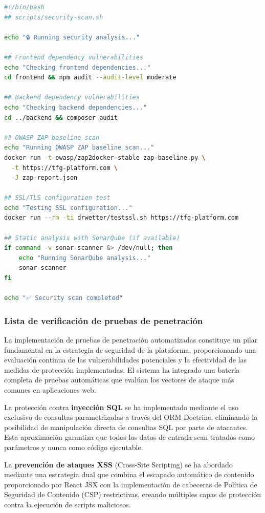 \documentclass[12pt,a4paper,oneside]{report}
\begin{document}
\begin{lstlisting}[language=bash]
#!/bin/bash
## scripts/security-scan.sh

echo "🔒 Running security analysis..."

## Frontend dependency vulnerabilities
echo "Checking frontend dependencies..."
cd frontend && npm audit --audit-level moderate

## Backend dependency vulnerabilities  
echo "Checking backend dependencies..."
cd ../backend && composer audit

## OWASP ZAP baseline scan
echo "Running OWASP ZAP baseline scan..."
docker run -t owasp/zap2docker-stable zap-baseline.py \
  -t https://tfg-platform.com \
  -J zap-report.json

## SSL/TLS configuration test
echo "Testing SSL configuration..."
docker run --rm -ti drwetter/testssl.sh https://tfg-platform.com

## Static analysis with SonarQube (if available)
if command -v sonar-scanner &> /dev/null; then
    echo "Running SonarQube analysis..."
    sonar-scanner
fi

echo "✅ Security scan completed"
\end{lstlisting}

\subsubsection{Lista de verificación de pruebas de penetración}\label{penetration-testing-checklist}

La implementación de pruebas de penetración automatizadas constituye un pilar fundamental en la estrategia de seguridad de la plataforma, proporcionando una evaluación continua de las vulnerabilidades potenciales y la efectividad de las medidas de protección implementadas. El sistema ha integrado una batería completa de pruebas automáticas que evalúan los vectores de ataque más comunes en aplicaciones web.

La protección contra \textbf{inyección SQL} se ha implementado mediante el uso exclusivo de consultas parametrizadas a través del ORM Doctrine, eliminando la posibilidad de manipulación directa de consultas SQL por parte de atacantes. Esta aproximación garantiza que todos los datos de entrada sean tratados como parámetros y nunca como código ejecutable.

La \textbf{prevención de ataques XSS} (Cross-Site Scripting) se ha abordado mediante una estrategia dual que combina el escapado automático de contenido proporcionado por React JSX con la implementación de cabeceras de Política de Seguridad de Contenido (CSP) restrictivas, creando múltiples capas de protección contra la ejecución de scripts maliciosos.
\end{document}
